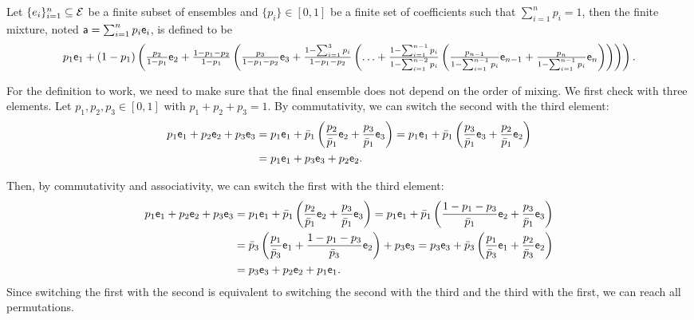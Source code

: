 \begin{mathSection}
\begin{defn}
	Let $\{e_i\}_{i=1}^{n} \subseteq \Ens$ be a finite subset of ensembles and $\{p_i\} \in [0,1]$ be a finite set of coefficients such that $\sum_{i=1}^{n} p_i = 1$, then the finite mixture, noted $\ens[a] = \sum_{i=1}^{n} p_i \ens_i$, is defined to be
	$$p_1 \ens_1 + (1-p_1)\left( \tfrac{p_2}{1-p_1} \ens_2 + \tfrac{1-p_1-p_2}{1-p_1} \left( \tfrac{p_3}{1-p_1-p_2} \ens_3 +  \tfrac{1-\sum_{i=1}^{3}p_i}{1-p_1-p_2}\left(\ldots+\tfrac{1-\sum_{i=1}^{n-1}p_i}{1-\sum_{i=1}^{n-2}p_i}\left(\tfrac{p_{n-1}}{1- \sum_{i=1}^{n-1}p_i} \ens_{n-1} + \tfrac{p_n}{1- \sum_{i=1}^{n-1}p_i}\ens_n\right)\right) \right) \right).$$
\end{defn}

\begin{check}
	For the definition to work, we need to make sure that the final ensemble does not depend on the order of mixing. We first check with three elements. Let $p_1, p_2, p_3 \in [0,1]$ with $p_1+p_2+p_3=1$. By commutativity, we can switch the second with the third element:
	\begin{equation}
	\begin{aligned}
		p_1 \ens[e]_1 + p_2 \ens[e]_2 + p_3 \ens_3 &= p_1 \ens_1 + \bar{p}_1\left(\frac{p_2}{\bar{p}_1}\ens_2 + \frac{p_3}{\bar{p}_1}\ens_3\right) = p_1 \ens_1 + \bar{p}_1\left(\frac{p_3}{\bar{p}_1} \ens_3 +  \frac{p_2}{\bar{p}_1}\ens_2\right) \\
		&= p_1 \ens[e]_1 + p_3 \ens[e]_3 + p_2 \ens_2.
	\end{aligned}
	\end{equation}
	
	Then, by commutativity and associativity, we can switch the first with the third element:
	\begin{equation}
		\begin{aligned}
	 p_1 \ens[e]_1 + p_2 \ens[e]_2 + p_3 \ens_3 &= p_1 \ens_1 + \bar{p}_1\left(\frac{p_2}{\bar{p}_1}\ens_2 + \frac{p_3}{\bar{p}_1}\ens_3\right) = p_1 \ens_1 + \bar{p}_1\left(\frac{1-p_1-p_3}{\bar{p}_1}\ens_2 + \frac{p_3}{\bar{p}_1}\ens_3\right) \\
	 &= \bar{p}_3\left(\frac{p_1}{\bar{p}_3} \ens_1 + \frac{1-p_1-p_3}{\bar{p}_3}\ens_2\right) + p_3 \ens_3 = p_3 \ens_3 + \bar{p}_3\left(\frac{p_1}{\bar{p}_3} \ens_1 + \frac{p_2}{\bar{p}_3}\ens_2\right) \\
	 &= p_3 \ens[e]_3 + p_2 \ens[e]_2 + p_1 \ens_1.
		\end{aligned}
	\end{equation}
	Since switching the first with the second is equivalent to switching the second with the third and the third with the first, we can reach all permutations.
	

\end{check}
\end{mathSection}
